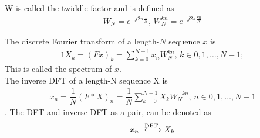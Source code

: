 W is called the twiddle factor and is defined as 
\begin{align*}
	W_N = e^{-j 2 \pi\frac{1}{N}}, \, W_N^{kn} = e^{-j 2 \pi\frac{kn}{N}}
\end{align*}

\begin{definition}
The discrete Fourier transform of a length-$N$ sequence $x$ is 
\begin{align*}1
	X_k = (Fx)_k = \sum_{k=0}^{N-1} x_n W_N^{kn}, \, k\in {0, 1, \dots, N-1};
\end{align*}
This is called the spectrum of $x$.\\
The inverse DFT of a length-N sequence X is
\begin{align*}
	x_n = \dfrac{1}{N}(F*X)_n = \dfrac{1}{N}\sum_{k=0}^{N-1} X_k W_N^{-kn}, \, n \in {0, 1, \dots, N-1}
\end{align*}
.
The DFT and inverse DFT as a pair, can be denoted as 
\begin{align*}
	x_n \xleftrightarrow{\text{DFT}} X_k
\end{align*}
\end{definition} 
\cite{FSP}